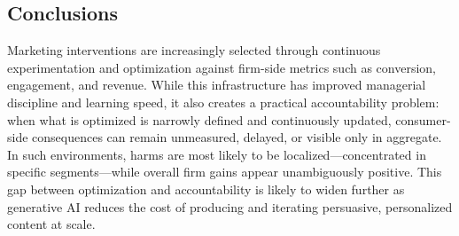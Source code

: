 \documentclass[11pt,letterpaper,english]{article}
\theoremstyle{definition}
\theoremstyle{definition}
\begin{document}
\begin{bibunit}

\section{Conclusions}
\label{sec:conclusion}

Marketing interventions are increasingly selected through continuous experimentation and optimization against firm-side metrics such as conversion, engagement, and revenue. While this infrastructure has improved managerial discipline and learning speed, it also creates a practical accountability problem: when what is optimized is narrowly defined and continuously updated, consumer-side consequences can remain unmeasured, delayed, or visible only in aggregate. In such environments, harms are most likely to be localized—concentrated in specific segments—while overall firm gains appear unambiguously positive. This gap between optimization and accountability is likely to widen further as generative AI reduces the cost of producing and iterating persuasive, personalized content at scale.


\end{bibunit}
\end{document}

